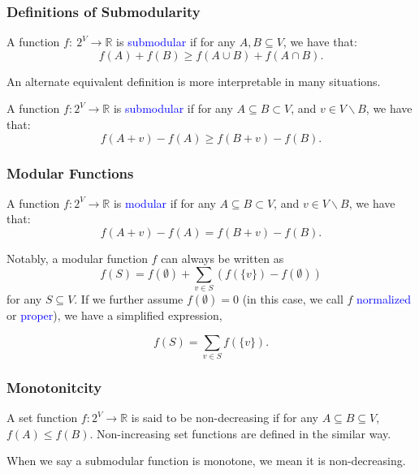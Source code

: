\documentclass{beamer}
\newcommand{\emRed}[1][]{\textcolor{blue} #1}
\newcommand{\bbR}{\mathbb{R}}
\begin{document}
\begin{frame}
\frametitle{Definitions of Submodularity}
\begin{definition}
  \label{def:sub-concave}
  A function $f:~2^V \rightarrow \bbR$ is \emRed{submodular} if for any $A, B \subseteq V$, we have that:
  \begin{equation}
    \label{eq:sub-concave}
    f(A) + f(B) \geq f(A \cup B) + f(A \cap B).
  \end{equation}
\end{definition}

\pause
An alternate equivalent definition is more interpretable in many situations.

\begin{definition}
  \label{def:sub-diminishing}
  A function $f: 2^V \rightarrow \bbR$ is \emRed{submodular} if for any $A \subseteq B \subset V$, and $v \in V\backslash B$, we have that:
  \begin{equation}
    \label{eq:sub-diminishing}
    f(A + v) - f(A) \geq f(B + v) - f(B).
  \end{equation}
\end{definition}

\end{frame}


\begin{frame}
\frametitle{Modular Functions}
\begin{definition}[Modularity]
  \label{def:modular}
  A function $f: 2^V \rightarrow \bbR$ is \emRed{modular} if for any $A \subseteq B \subset V$, and $v \in V\backslash B$, we have that:
  \begin{equation}
    \label{eq:modular}
    f(A + v) - f(A) = f(B + v) - f(B).
  \end{equation}
\end{definition}
Notably, a modular function $f$ can always be written as
$$f(S) = f(\emptyset) + \sum_{v\in S} \left( f(\{v\}) - f(\emptyset) \right)$$
for any $S \subseteq V$. If we further assume $f(\emptyset) = 0$ (in this case, we call $f$ \emRed{normalized} or \emRed{proper}), we have a simplified expression,

$$f(S) = \sum_{v\in S} f(\{v\}).$$
\end{frame}

\begin{frame}
\frametitle{Monotonitcity}
\begin{definition}[Monotonitcity]
  A set function $f: 2^V \rightarrow  \bbR$ is said to be non-decreasing if for any $A\subseteq B \subseteq V$, $f(A) \leq f(B)$. Non-increasing set functions are defined in the similar way.
\end{definition}
When we say a submodular function is monotone, we mean it is non-decreasing.
\end{frame}
\end{document}
